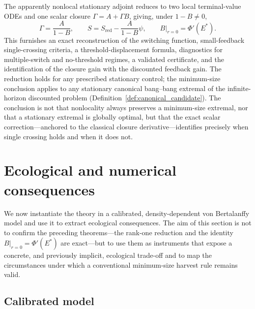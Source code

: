 \documentclass[pdflatex,sn-mathphys-num]{sn-jnl}
\theoremstyle{plain}
\theoremstyle{definition}
\theoremstyle{remark}
\begin{document}
The apparently nonlocal stationary adjoint reduces to two local terminal-value
ODEs and one scalar closure $\Gamma=A+\Gamma B$, giving, under $1-B\neq0$,
\[
\Gamma=\frac{A}{1-B},
\qquad
S=S_{\mathrm{red}}-\frac{A}{1-B}\psi,
\qquad
B|_{r=0}=\Phi'(E^*).
\]
This furnishes an exact reconstruction of the switching function, small-feedback
single-crossing criteria, a threshold-displacement formula, diagnostics for
multiple-switch and no-threshold regimes, a validated certificate, and the
identification of the closure gain with the discounted feedback gain. The reduction
holds for any prescribed stationary control; the minimum-size conclusion applies to
any stationary canonical bang--bang extremal of the infinite-horizon discounted
problem (Definition~\ref{def:canonical_candidate}). The conclusion is not that
nonlocality always preserves a minimum-size extremal, nor that a stationary
extremal is globally optimal, but that the exact scalar correction---anchored to
the classical closure derivative---identifies precisely when single crossing holds
and when it does not.

\section{Ecological and numerical consequences}
\label{sec:concrete}

We now instantiate the theory in a calibrated, density-dependent von Bertalanffy \cite{von1938quantitative,de2008simplifying}
model and use it to extract ecological consequences. The aim of this section is
not to confirm the preceding theorems---the rank-one reduction and the identity
$B|_{r=0}=\Phi'(E^*)$ are exact---but to use them as instruments that expose a
concrete, and previously implicit, ecological trade-off and to map the
circumstances under which a conventional minimum-size harvest rule remains valid.

\subsection{Calibrated model}
\label{subsec:calibration}
\end{document}
